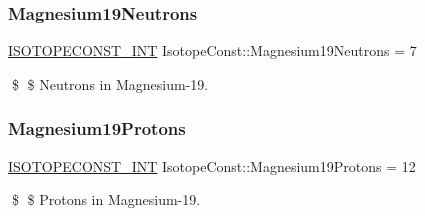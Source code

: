 \subsubsection{\texorpdfstring{Magnesium19\+Neutrons}{Magnesium19Neutrons}}
{\footnotesize\ttfamily \mbox{\hyperlink{group___isotope_const-_macros_ga5f18360b3e99483a35c32d789e62621c}{I\+S\+O\+T\+O\+P\+E\+C\+O\+N\+S\+T\+\_\+\+I\+NT}} Isotope\+Const\+::\+Magnesium19\+Neutrons = 7}

\$ \$ Neutrons in Magnesium-\/19. \mbox{\label{group___isotope_const-_magnesium-_mg19_ga991ce87c75080131588372f4f632ae1e}} 
\subsubsection{\texorpdfstring{Magnesium19\+Protons}{Magnesium19Protons}}
{\footnotesize\ttfamily \mbox{\hyperlink{group___isotope_const-_macros_ga5f18360b3e99483a35c32d789e62621c}{I\+S\+O\+T\+O\+P\+E\+C\+O\+N\+S\+T\+\_\+\+I\+NT}} Isotope\+Const\+::\+Magnesium19\+Protons = 12}

\$ \$ Protons in Magnesium-\/19. 